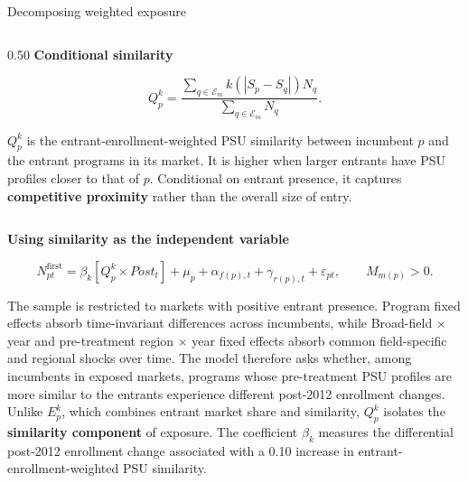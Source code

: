 \documentclass{beamer}
\begin{document}
\begin{frame}{Decomposing weighted exposure}
\begin{columns}[T,onlytextwidth]
\begin{column}{0.50\textwidth}
\textbf{Conditional similarity}

\tiny
\[
Q_p^k
=
\frac{
\sum_{q\in\mathcal E_m}
k\!\left(|S_p-S_q|\right)N_q
}{
\sum_{q\in\mathcal E_m}N_q
}.
\]

\tiny
\(Q_p^k\) is the entrant-enrollment-weighted PSU similarity between incumbent
\(p\) and the entrant programs in its market. It is higher when larger
entrants have PSU profiles closer to that of \(p\).
Conditional on entrant presence, it captures \textbf{competitive proximity}
rather than the overall size of entry.

\end{column}

\end{columns}

\vspace{0.06cm}


\textbf{Using similarity as the independent variable}

\tiny
\[
N^{\mathrm{first}}_{pt}
=
\beta_k
\left[
Q_p^k\times Post_t
\right]
+\mu_p+\alpha_{f(p),t}+\gamma_{r(p),t}
+\varepsilon_{pt},
\qquad M_{m(p)}>0.
\]

\tiny
The sample is restricted to markets with positive entrant presence.
Program fixed effects absorb time-invariant differences across incumbents,
while Broad-field \(\times\) year and pre-treatment region \(\times\) year
fixed effects absorb common field-specific and regional shocks over time.
The model therefore asks whether, among incumbents in exposed markets,
programs whose pre-treatment PSU profiles are more similar to the entrants
experience different post-2012 enrollment changes.
Unlike \(E_p^k\), which combines entrant market share and similarity,
\(Q_p^k\) isolates the \textbf{similarity component} of exposure.
The coefficient \(\beta_k\) measures the differential post-2012 enrollment
change associated with a 0.10 increase in entrant-enrollment-weighted PSU
similarity.

\end{frame}
\end{document}
